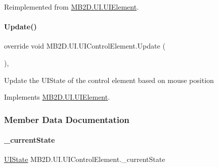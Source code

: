 Reimplemented from \hyperlink{class_m_b2_d_1_1_u_i_1_1_u_i_element_afec98e6e38cb0dbc17a5db6d6a3d5ba5}{M\+B2\+D.\+U\+I.\+U\+I\+Element}.

\hypertarget{class_m_b2_d_1_1_u_i_1_1_u_i_control_element_aa43f7ea6155de3086efbf29396ea2ccf}{}\label{class_m_b2_d_1_1_u_i_1_1_u_i_control_element_aa43f7ea6155de3086efbf29396ea2ccf} 
\paragraph{\texorpdfstring{Update()}{Update()}}
{\footnotesize\ttfamily override void M\+B2\+D.\+U\+I.\+U\+I\+Control\+Element.\+Update (\begin{DoxyParamCaption}{ }\end{DoxyParamCaption})\hspace{0.3cm}{\ttfamily [inline]}, {\ttfamily [virtual]}}



Update the U\+I\+State of the control element based on mouse position 



Implements \hyperlink{class_m_b2_d_1_1_u_i_1_1_u_i_element_aa97bcbe44f3fac8a13e2febca23b2d4d}{M\+B2\+D.\+U\+I.\+U\+I\+Element}.



\subsubsection{Member Data Documentation}
\hypertarget{class_m_b2_d_1_1_u_i_1_1_u_i_control_element_a20ac4c2a32e73de2457240bf42f512fa}{}\label{class_m_b2_d_1_1_u_i_1_1_u_i_control_element_a20ac4c2a32e73de2457240bf42f512fa} 
\paragraph{\texorpdfstring{\+\_\+current\+State}{\_currentState}}
{\footnotesize\ttfamily \hyperlink{namespace_m_b2_d_1_1_u_i_a3d5fed7e80959a1444165894dfd9e75b}{U\+I\+State} M\+B2\+D.\+U\+I.\+U\+I\+Control\+Element.\+\_\+current\+State\hspace{0.3cm}{\ttfamily [protected]}}



